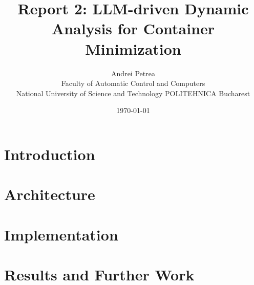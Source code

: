 \documentclass[12pt]{article}
\title{Report 2: LLM-driven Dynamic Analysis for Container Minimization}
\author{Andrei Petrea\\
Faculty of Automatic Control and Computers\\
National University of Science and Technology POLITEHNICA Bucharest\\
}
\date{\today}
\begin{document}
\maketitle

\begin{abstract}

\end{abstract}

\section{Introduction}
\label{sec:introduction}

\pagebreak

\section{Architecture}
\label{sec:architecture}

\pagebreak

\section{Implementation}
\label{sec:implementation}

\pagebreak


\section{Results and Further Work}
\label{sec:results}

\pagebreak



\end{document}
